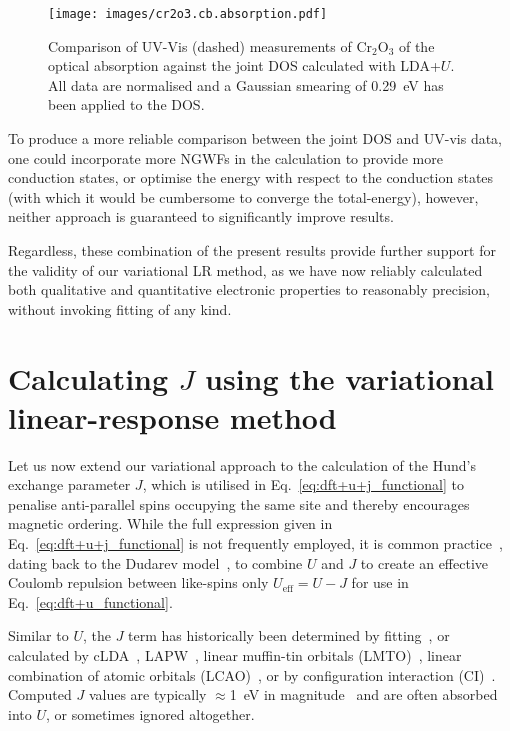 \begin{figure}[th!]
\centering
\texttt{[image: images/cr2o3.cb.absorption.pdf]}
\caption[Normalised absorption spectrum of Cr$_2$O$_3$ 
compared to LDA+$U$ joint DOS]
{Comparison of 
UV-Vis (dashed) measurements of Cr$_2$O$_3$ 
of the optical absorption 
against the joint DOS calculated with LDA+$U$.
%
All data are normalised and 
a Gaussian smearing of 0.29~eV 
has been applied to the DOS.
}
\label{fig:cr2o3.cb.absorption}
\end{figure}

{
To produce a more reliable comparison 
between the joint DOS and UV-vis data, 
one could incorporate more NGWFs 
in the calculation to provide more conduction states, 
or optimise the energy with respect to the conduction states 
(with which it would be cumbersome to converge the total-energy), 
however, neither approach is guaranteed to significantly improve results.}

Regardless, 
these combination of the present results 
provide further support for the validity of 
our variational LR method,  
as we have now reliably calculated 
both qualitative and quantitative 
electronic properties to reasonably precision, 
without invoking fitting of any kind.


\section[Calculating $J$ using the variational linear-response method]{Calculating $J$ using the variational \break linear-response method}
\label{sec:calculating_j}	

Let us now extend our variational approach 
to the calculation of the Hund's exchange parameter $J$, 
which is utilised in Eq.~\eqref{eq:dft+u+j_functional} 
to penalise anti-parallel spins occupying the same site 
and thereby encourages magnetic ordering.
%
While the full expression given 
in Eq.~\eqref{eq:dft+u+j_functional} 
is not frequently employed, 
it is common practice~\cite{PhysRevB.79.035103}, 
dating back to the Dudarev model~\cite{PhysRevB.57.1505}, 
to combine $U$ and $J$ to create 
an effective Coulomb repulsion between like-spins only 
$U_\textrm{eff}=U-J$ 
for use in Eq.~\eqref{eq:dft+u_functional}.

Similar to $U$, 
the $J$ term has historically been determined 
by fitting~\cite{PhysRevB.70.125426}, 
or calculated by 
cLDA~\cite{PhysRevB.44.943}, 
LAPW~\cite{Cai200989,0295-5075-69-5-777,PhysRevB.79.104404}, 
linear muffin-tin orbitals (LMTO)~\cite{PhysRevB.44.943}, 
linear combination of atomic orbitals (LCAO)~\cite{0953-8984-9-3-005}, 
or by configuration interaction (CI)~\cite{PhysRevB.63.214520,Calzado2001}.
%
Computed $J$ values are typically 
$\approx$1~eV in magnitude~\cite{PhysRevB.44.943} 
and are often absorbed into $U$, 
or sometimes ignored altogether.

